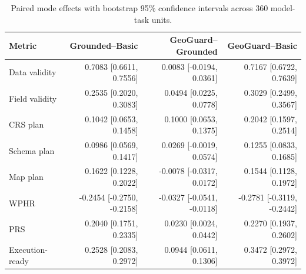 \begin{table}[htbp]
\centering
\caption{Paired mode effects with bootstrap 95\% confidence intervals across 360 model-task units.}
\label{tab:bootstrap-mode-effects}
\scriptsize
\setlength{\tabcolsep}{3pt}
\begin{tabular}{lrrr}
\toprule
Metric & Grounded--Basic & GeoGuard--Grounded & GeoGuard--Basic \\
\midrule
Data validity & 0.7083 [0.6611, 0.7556] & 0.0083 [-0.0194, 0.0361] & 0.7167 [0.6722, 0.7639] \\
Field validity & 0.2535 [0.2020, 0.3083] & 0.0494 [0.0225, 0.0778] & 0.3029 [0.2499, 0.3567] \\
CRS plan & 0.1042 [0.0653, 0.1458] & 0.1000 [0.0653, 0.1375] & 0.2042 [0.1597, 0.2514] \\
Schema plan & 0.0986 [0.0569, 0.1417] & 0.0269 [-0.0019, 0.0574] & 0.1255 [0.0833, 0.1685] \\
Map plan & 0.1622 [0.1228, 0.2022] & -0.0078 [-0.0317, 0.0172] & 0.1544 [0.1128, 0.1972] \\
WPHR & -0.2454 [-0.2750, -0.2158] & -0.0327 [-0.0541, -0.0118] & -0.2781 [-0.3119, -0.2442] \\
PRS & 0.2040 [0.1751, 0.2335] & 0.0230 [0.0024, 0.0442] & 0.2270 [0.1937, 0.2602] \\
Execution-ready & 0.2528 [0.2083, 0.2972] & 0.0944 [0.0611, 0.1306] & 0.3472 [0.2972, 0.3972] \\
\bottomrule
\end{tabular}
\end{table}
